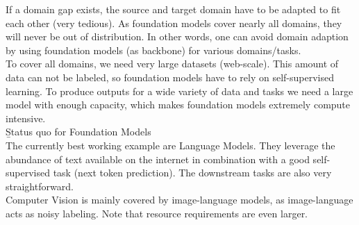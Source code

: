 If a domain gap exists, the source and target domain have to be adapted to fit each other (very tedious). As foundation models cover nearly all domains, they will never be out of distribution. In other words, one can avoid domain adaption by using foundation models (as backbone) for various domains/tasks.\\

To cover all domains, we need very large datasets (web-scale). This amount of data can not be labeled, so foundation models have to rely on self-supervised learning. To produce outputs for a wide variety of data and tasks we need a large model with enough capacity, which makes foundation models extremely compute intensive.\\

\b{Status quo for Foundation Models\\[.5em]}
The currently best working example are Language Models. They leverage the abundance of text available on the internet in combination with a good self-supervised task (next token prediction). The downstream tasks are also very straightforward.\\

Computer Vision is mainly covered by image-language models, as image-language acts as noisy labeling. Note that resource requirements are even larger.